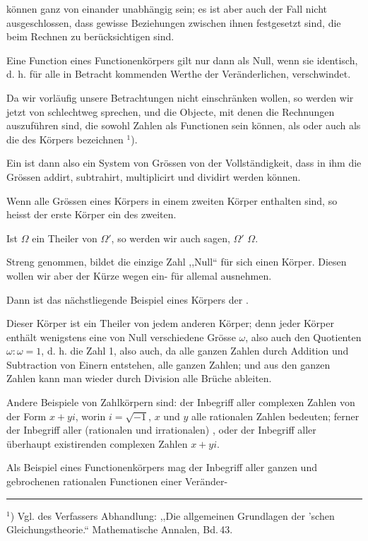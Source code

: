 k\"onnen ganz von einander unabh\"angig sein; es ist aber auch der Fall nicht ausgeschlossen, dass gewisse Beziehungen zwischen ihnen festgesetzt sind, die beim Rechnen zu ber\"ucksichtigen sind.

Eine Function eines Functionenk\"orpers gilt nur dann als Null, wenn sie identisch, d. h. f\"ur alle in Betracht kommenden Werthe der Ver\"anderlichen, verschwindet.

Da wir vorl\"aufig unsere Betrachtungen nicht einschr\"anken wollen, so werden wir jetzt von  schlechtweg sprechen, und die Objecte, mit denen die Rechnungen auszuf\"uhren sind, die sowohl Zahlen als Functionen sein k\"onnen, als  oder auch als die  des K\"orpers bezeichnen $^1$).

Ein  ist dann also ein System von Gr\"ossen von der Vollst\"andigkeit, dass in ihm die Gr\"ossen addirt, subtrahirt, multiplicirt und dividirt werden k\"onnen.

Wenn alle Gr\"ossen eines K\"orpers in einem zweiten K\"orper enthalten sind, so heisst der erste K\"orper ein  des zweiten.

Ist $\Omega$ ein Theiler von $\Omega'$, so werden wir auch sagen, $\Omega'$  $\Omega$.

Streng genommen, bildet die einzige Zahl ,,Null`` f\"ur sich einen K\"orper. Diesen wollen wir aber der K\"urze wegen ein- f\"ur allemal ausnehmen.

Dann ist das n\"achstliegende Beispiel eines K\"orpers der .

Dieser K\"orper ist ein Theiler von jedem anderen K\"orper; denn jeder K\"orper enth\"alt wenigstens eine von Null verschiedene Gr\"osse $\omega$, also auch den Quotienten $\omega:\omega=1$, d. h. die Zahl 1, also auch, da alle ganzen Zahlen durch Addition und Subtraction von Einern entstehen, alle ganzen Zahlen; und aus den ganzen Zahlen kann man wieder durch Division alle Br\"uche ableiten.

Andere Beispiele von Zahlk\"orpern sind: der Inbegriff aller complexen Zahlen von der Form $x+yi$, worin $i=\sqrt{-1}$, $x$ und $y$ alle rationalen Zahlen bedeuten; ferner der Inbegriff aller (rationalen und irrationalen) , oder der Inbegriff aller \"uberhaupt existirenden complexen Zahlen $x+yi$.

Als Beispiel eines Functionenk\"orpers mag der Inbegriff aller ganzen und gebrochenen rationalen Functionen einer Ver\"ander-

\par\noindent\rule{4cm}{0.4pt}\par
{\footnotesize $^1$) Vgl. des Verfassers Abhandlung: ,,Die allgemeinen Grundlagen der 'schen Gleichungstheorie.`` Mathematische Annalen, Bd.\,43.}
